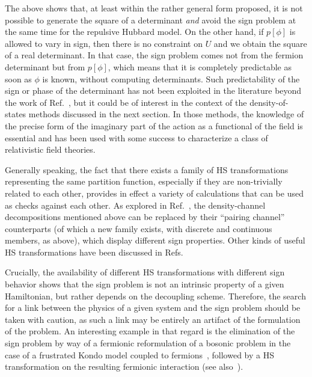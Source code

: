 \documentclass[../main.tex]{subfiles}
\begin{document}
The above shows that, at least within the rather general form proposed, it is not possible to generate the square of a determinant {\it and} avoid the
sign problem at the same time for the repulsive Hubbard model.
On the other hand, if $p[\phi]$ is allowed to vary in sign, then there is no constraint on $U$ and we obtain the square of a real determinant. In that
case, the sign problem comes not from the fermion determinant but from $p[\phi]$, which means that it is completely predictable as soon as $\phi$
is known, without computing determinants. Such predictability of the sign or phase of the determinant has not been exploited in the literature beyond
the work of Ref.~\cite{PhysRevB.48.589}, but it could be of interest in the context of the density-of-states methods discussed in the next section.
In those methods, the knowledge of the precise form of the imaginary part of the action as a functional of the field is essential and has been used
with some success to characterize a class of relativistic field theories.

Generally speaking, the fact that there exists a family of HS transformations representing the same partition function,
especially if they are non-trivially related to each other, provides in effect a variety of calculations that can be used as checks against each other.
As explored in Ref.~\cite{PhysRevB.42.2282},
the density-channel decompositions mentioned above can be replaced by their ``pairing channel'' counterparts
(of which a new family exists, with discrete and continuous members, as above), which display different sign properties.
Other kinds of useful HS transformations have been discussed in Refs.~\cite{PhysRevB.56.15001,doi:10.1143/JPSJ.66.1872}

Crucially, the availability of different HS transformations with different sign behavior shows that the sign problem is not an intrinsic property of
a given Hamiltonian, but rather depends on the decoupling scheme. Therefore, the search for a link between the physics of a given system and the
sign problem should be taken with caution, as such a link may be entirely an artifact of the formulation of the problem. An interesting example
in that regard is the elimination of the sign problem by way of a fermionic reformulation of a bosonic problem in the case of
a frustrated Kondo model coupled to fermions~\cite{PhysRevLett.120.107201}, followed by a HS transformation on the resulting fermionic interaction
(see also~\cite{PhysRevB.63.155114, PhysRevLett.83.796}).
\end{document}
